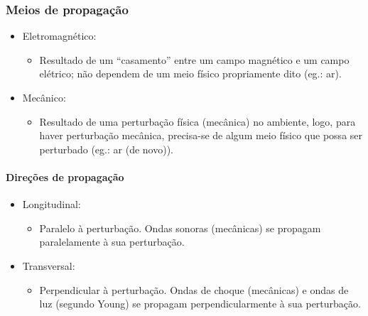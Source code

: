\documentclass[
  a4paper]{article}
\providecommand{\tightlist}{%
  \setlength{\itemsep}{0pt}\setlength{\parskip}{0pt}}
\begin{document}
\hypertarget{meios-de-propagauxe7uxe3o}{%
\subsubsection{Meios de propagação}\label{meios-de-propagauxe7uxe3o}}

\begin{itemize}
\tightlist
\item
  Eletromagnético:

  \begin{itemize}
  \tightlist
  \item
    Resultado de um ``casamento'' entre um campo magnético e um campo
    elétrico; não dependem de um meio físico propriamente dito (eg.:
    ar).
  \end{itemize}
\item
  Mecânico:

  \begin{itemize}
  \tightlist
  \item
    Resultado de uma perturbação física (mecânica) no ambiente, logo,
    para haver perturbação mecânica, precisa-se de algum meio físico que
    possa ser perturbado (eg.: ar (de novo)).
  \end{itemize}
\end{itemize}

\hypertarget{direuxe7uxf5es-de-propagauxe7uxe3o}{%
\paragraph{Direções de
propagação}\label{direuxe7uxf5es-de-propagauxe7uxe3o}}

\begin{itemize}
\tightlist
\item
  Longitudinal:

  \begin{itemize}
  \tightlist
  \item
    Paralelo à perturbação. Ondas sonoras (mecânicas) se propagam
    paralelamente à sua perturbação.
  \end{itemize}
\item
  Transversal:

  \begin{itemize}
  \tightlist
  \item
    Perpendicular à perturbação. Ondas de choque (mecânicas) e ondas de
    luz (segundo Young) se propagam perpendicularmente à sua
    perturbação.
  \end{itemize}
\end{itemize}
\end{document}
